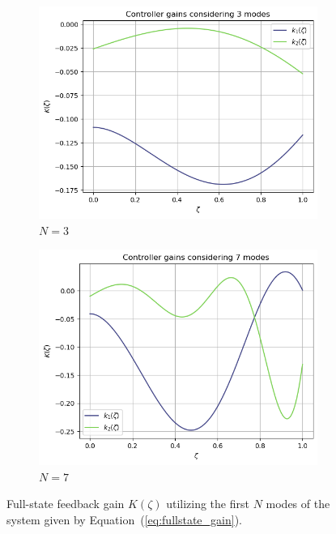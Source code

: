 \begin{figure}[!htbp]
    \centering
    \begin{subfigure}[b]{0.45\textwidth}
        \centering
        \includegraphics[width=\textwidth]{papers/1_optimal/figures/k_3.png}
        \caption{$N = 3$}
        \label{fig:k_3}
    \end{subfigure}
    \hfill
    \begin{subfigure}[b]{0.45\textwidth}
        \centering
        \includegraphics[width=\textwidth]{papers/1_optimal/figures/k_7.png}
        \caption{$N = 7$}
        \label{fig:k_7}
    \end{subfigure}
    \caption{Full-state feedback gain ${K}(\zeta)$ utilizing the first $N$ modes of the system given by Equation~(\ref{eq:fullstate_gain}).}
    \label{fig:k_modes}
\end{figure}

